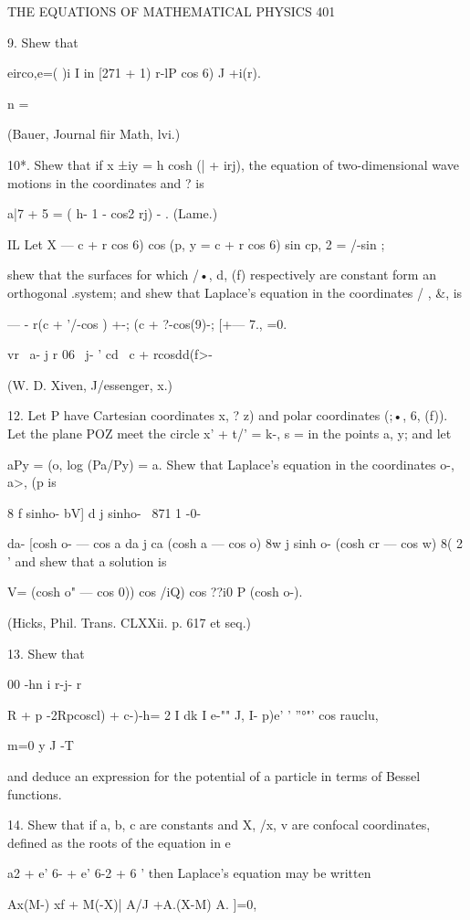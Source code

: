 THE EQUATIONS OF MATHEMATICAL PHYSICS 401

9. Shew that

eirco,e=( )i I in [271 + 1) r-lP cos 6) J +i(r).

n =

(Bauer, Journal fiir Math, lvi.)

10*. Shew that if x ±iy = h cosh (| + irj), the equation of
two-dimensional wave motions in the coordinates and ? is

a|7 + 5 = ( h- 1 - cos2 rj) - . (Lame.)

IL Let X — c + r cos 6) cos (p, y = c + r cos 6) sin cp, 2 = /-sin ;

shew that the surfaces for which /•, d, (f) respectively are constant
form an orthogonal .system; and shew that Laplace's equation in the
coordinates / , \&, is

— - r(c + '/-cos ) +-; (c + ?-cos(9)-; [+— 7., =0.

vr \ a- j r 06 \ j- ' cd \ c + rcosdd(f>-

(W. D. Xiven, J/essenger, x.)

12. Let P have Cartesian coordinates x, ? z) and polar coordinates
(;•, 6, (f)). Let the plane POZ meet the circle x' + t/' = k-, s = in
the points a, y; and let

aPy = (o, log (Pa/Py) = a. Shew that Laplace's equation in the
coordinates o-, a>, (p is

8 f sinho- bV] d j sinho- \ 871 1 -0-

da- [cosh o- — cos a da j ca (cosh a — cos o) 8w j sinh o- (cosh cr —
cos w) 8( 2 ' and shew that a solution is

V= (cosh o" — cos 0)) cos /iQ) cos ??i0 P (cosh o-).

(Hicks, Phil. Trans. CLXXii. p. 617 et seq.)

13. Shew that

00 -hn i r-j- r

 R + p -2Rpcoscl) + c-)-h= 2 I dk I e-"" J, I- p)e' ' ''°"' cos
rauclu,

m=0 y J -T

and deduce an expression for the potential of a particle in terms of
Bessel functions.

14. Shew that if a, b, c are constants and X, /x, v are confocal
coordinates, defined as the roots of the equation in e

a2 + e' 6- + e' 6-2 + 6 ' then Laplace's equation may be written

Ax(M-) xf + M(-X)| A/J +A.(X-M) A. ]=0,

